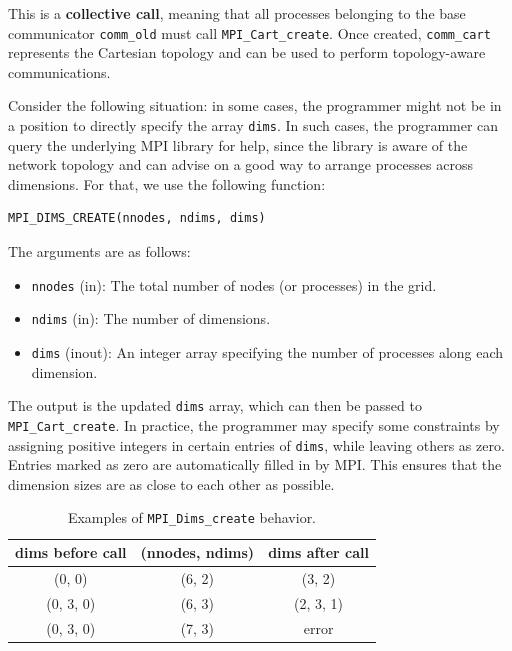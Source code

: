 \documentclass[12pt]{book}
\begin{document}
\noindent
This is a \textbf{collective call}, meaning that all processes belonging to the base communicator \texttt{comm\_old} must call \texttt{MPI\_Cart\_create}. Once created, \texttt{comm\_cart} represents the Cartesian topology and can be used to perform topology-aware communications.

Consider the following situation: in some cases, the programmer might not be in a position to directly specify the array \texttt{dims}. In such cases, the programmer can query the underlying MPI library for help, since the library is aware of the network topology and can advise on a good way to arrange processes across dimensions. For that, we use the following function:

\begin{lstlisting}[style=cppstyle]
MPI_DIMS_CREATE(nnodes, ndims, dims)
\end{lstlisting}

The arguments are as follows:
\begin{itemize}
    \item \texttt{nnodes} (in): The total number of nodes (or processes) in the grid.
    \item \texttt{ndims} (in): The number of dimensions.
    \item \texttt{dims} (inout): An integer array specifying the number of processes along each dimension.
\end{itemize}

\noindent
The output is the updated \texttt{dims} array, which can then be passed to \texttt{MPI\_Cart\_create}.  
In practice, the programmer may specify some constraints by assigning positive integers in certain entries of \texttt{dims}, while leaving others as zero. Entries marked as zero are automatically filled in by MPI. This ensures that the dimension sizes are as close to each other as possible.

\begin{table}[H]
    \centering
    \begin{tabular}{ccc}
        \hline
        dims before call & (nnodes, ndims) & dims after call \\
        \hline
        (0, 0) & (6, 2) & (3, 2) \\
        (0, 3, 0) & (6, 3) & (2, 3, 1) \\
        (0, 3, 0) & (7, 3) & error \\
        \hline
    \end{tabular}
    \caption{Examples of \texttt{MPI\_Dims\_create} behavior.}
    \label{tab:example_cart}
\end{table}
\end{document}
